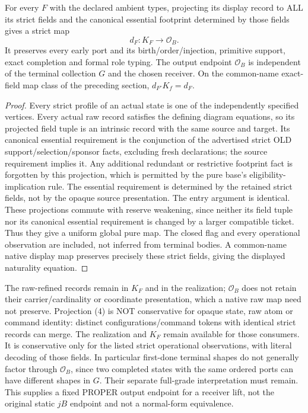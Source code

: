 \documentclass[11pt]{article}
\begin{document}
\begin{proposition}
For every $F$ with the declared ambient types, projecting its display record to ALL its strict fields and the canonical essential footprint determined by those fields gives a strict map
\[
                       d_F:K_F\longrightarrow\mathcal O_B.       \tag{4}
\]
It preserves every early port and its birth/order/injection, primitive support, exact completion and formal role typing. The output endpoint $\mathcal O_B$ is independent of the terminal collection $G$ and the chosen receiver. On the common-name exact-field map class of the preceding section, $d_{F'}K_f=d_F$.
\end{proposition}
\begin{proof}
Every strict profile of an actual state is one of the independently specified vertices. Every actual raw record satisfies the defining diagram equations, so its projected field tuple is an intrinsic record with the same source and target. Its canonical essential requirement is the conjunction of the advertised strict OLD support/selection/sponsor facts, excluding fresh declarations; the source requirement implies it. Any additional redundant or restrictive footprint fact is forgotten by this projection, which is permitted by the pure base's eligibility-implication rule. The essential requirement is determined by the retained strict fields, not by the opaque source presentation. The entry argument is identical. These projections commute with reserve weakening, since neither its field tuple nor its canonical essential requirement is changed by a larger compatible ticket. Thus they give a uniform global pure map. The closed flag and every operational observation are included, not inferred from terminal bodies. A common-name native display map preserves precisely these strict fields, giving the displayed naturality equation.\end{proof}

The raw-refined records remain in $K_F$ and in the realization; $\mathcal O_B$ does not retain their carrier/cardinality or coordinate presentation, which a native raw map need not preserve. Projection (4) is NOT conservative for opaque state, raw atom or command identity: distinct configurations/command tokens with identical strict records can merge. The realization and $K_F$ remain available for those consumers. It is conservative only for the listed strict operational observations, with literal decoding of those fields. In particular first-done terminal shapes do not generally factor through $\mathcal O_B$, since two completed states with the same ordered ports can have different shapes in $G$. Their separate full-grade interpretation must remain. This supplies a fixed PROPER output endpoint for a receiver lift, not the original static $jB$ endpoint and not a normal-form equivalence.
\end{document}
